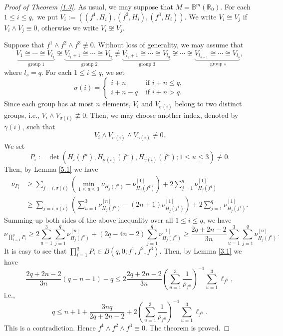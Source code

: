 \documentclass[12pt, a4paper, oneside]{amsart}
\newcommand{\B}{\mathbb{B}}
\newcommand{\R}{{\mathbb{R}}}
\numberwithin{equation}{section}
\begin{document}
\begin{proof}[Proof of Theorem \ref{1.3}]
As usual, we may suppose that $M=\B^m(\R_0)$. For each $1\le i\le q,$ we put $V_i:=( (f^1,H_i),(f^2,H_i),(f^3,H_i))$.  We write $V_i\cong V_j$ if $V_i\wedge V_j\equiv 0$, otherwise we write $V_i\not\cong V_j.$ 

Suppose that $f^1\wedge f^2\wedge f^3\not\equiv 0$. Without loss of generality, we may assume that
$$\underbrace{V_1\cong \cdots\cong V_{l_1}}_{\text { group } 1}\not\cong
\underbrace{V_{l_1+1}\cong\cdots\cong V_{l_2}}_{\text { group } 2}\not\equiv \underbrace{V_{l_2+1}\cong \cdots\cong V_{l_3}}_{\text { group } 3}\not\cong\cdots \not\cong\underbrace{V_{l_{s-1}}\cong\cdots\cong V_{l_{s}}}_{\text { group } s},$$
where $l_s=q.$ 
 For each $1\le i\le q$, we set
$$ \sigma (i)=\begin{cases}
i+n&\text{ if }i+n\le q,\\
i+n-q&\text{ if }i+n>q.
\end{cases} $$
Since each group has at most $n$ elements, $V_i$ and $V_{\sigma (i)}$ belong to two distinct groups, i.e., $V_i\wedge V_{\sigma (i)}\not\equiv 0$. Then, we may choose another index, denoted by $\gamma (i)$, such that 
$$V_i\wedge V_{\sigma (i)}\wedge V_{\gamma (i)}\not\equiv 0.$$
We set
$$ P_i:=\det\left(H_i(f^u),H_{\sigma (i)}(f^u),H_{\gamma (i)}(f^u);1\le u\le 3\right)\not\equiv 0.$$
Then, by Lemma \ref{5.1} we have
\begin{align*}
\nu_{P_i}&\ge  \sum_{j=i,\sigma(i)}\left(\min_{1\le u\le 3}\nu_{H_j(f^u)}-\nu^{[1]}_{H_j(f^1)}\right)+2\sum_{j=1}^q\nu^{[1]}_{H_j(f^1)}\\
&\ge \sum_{j=i,\sigma(i)}\left(\sum_{u=1}^3\nu^{[n]}_{H_j(f^u)}-(2n+1)\nu^{[1]}_{H_j(f^1)}\right)+2\sum_{j=1}^q\nu^{[1]}_{H_j(f^1)}.
\end{align*}
Summing-up both sides of the above inequality over all $1\le i\le q$, we have
$$\nu_{\prod_{i=1}^qP_i}\ge 2\sum_{u=1}^3\sum_{j=1}^q\nu^{[n]}_{H_j(f^u)}+(2q-4n-2)\sum_{j=1}^q\nu^{[1]}_{H_j(f^u)}\ge\frac{2q+2n-2}{3n}\sum_{u=1}^3\sum_{j=1}^q\nu^{[n]}_{H_j(f^u)}.$$
It is easy to see that $\prod_{i=1}^qP_i\in B(q,0;f^1,f^2,f^3).$
Then, by Lemma \ref{3.1} we have
$$ \frac{2q+2n-2}{3n}(q-n-1)-q\le 2\frac{2q+2n-2}{3n}\left(\sum_{u=1}^3\frac{1}{\rho_{f^u}}\right)^{-1}\sum_{u=1}^3\ell_{f^u},$$
i.e.,
$$ q\le n+1+\frac{3nq}{2q+2n-2}+2\left(\sum_{u=1}^3\frac{1}{\rho_{f^u}}\right)^{-1}\sum_{u=1}^3\ell_{f^u}.$$
This is a contradiction. Hence $f^1\wedge f^2\wedge f^3\equiv 0$. The theorem is proved.
\end{proof}
\end{document}
